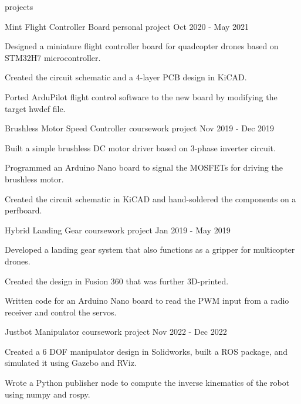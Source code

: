\documentclass[12pt, a4paper]{eon-resume}
\begin{document}
\begin{section}{projects}
  
  \begin{project}
    {Mint Flight Controller Board}
    {personal project}
    {Oct 2020 - May 2021}

    \item Designed a miniature flight controller board for quadcopter drones based on STM32H7 microcontroller.
    \item Created the circuit schematic and a 4-layer PCB design in KiCAD.
    \item Ported ArduPilot flight control software to the new board by modifying the target hwdef file.
  
  \end{project}

  \begin{project}
    {Brushless Motor Speed Controller}
    {coursework project}
    {Nov 2019 - Dec 2019}

    \item Built a simple brushless DC motor driver based on 3-phase inverter circuit.
    \item Programmed an Arduino Nano board to signal the MOSFETs for driving the brushless motor.
    \item Created the circuit schematic in KiCAD and hand-soldered the components on a perfboard.
  
  \end{project}

  \begin{project}
    {Hybrid Landing Gear}
    {coursework project}
    {Jan 2019 - May 2019}

    \item Developed a landing gear system that also functions as a gripper for multicopter drones.
    \item Created the design in Fusion 360 that was further 3D-printed.
    \item Written code for an Arduino Nano board to read the PWM input from a radio receiver and control the servos.
  
  \end{project}

  \begin{project}
    {Justbot Manipulator}
    {coursework project}
    {Nov 2022 - Dec 2022}

    \item Created a 6 DOF manipulator design in Solidworks, built a ROS package, and simulated it using Gazebo and RViz.
    \item Wrote a Python publisher node to compute the inverse kinematics of the robot using numpy and rospy.
  
  \end{project}

\end{section}
\end{document}
